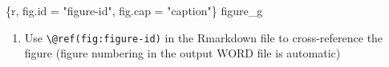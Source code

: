 \documentclass[
  letterpaper,
  DIV=11,
  numbers=noendperiod]{scrreprt}
\newenvironment{Shaded}{\begin{snugshade}}{\end{snugshade}}
\newcommand{\InformationTok}[1]{\textcolor[rgb]{0.37,0.37,0.37}{#1}}
\newcommand{\NormalTok}[1]{\textcolor[rgb]{0.00,0.23,0.31}{#1}}
\providecommand{\tightlist}{%
  \setlength{\itemsep}{0pt}\setlength{\parskip}{0pt}}\usepackage{longtable,booktabs,array}
\begin{document}
\begin{Shaded}
\begin{Highlighting}[]
\InformationTok{\textasciigrave{}\textasciigrave{}\textasciigrave{}\{r, fig.id = "figure{-}id", fig.cap = "caption"\}}
\NormalTok{figure\_g }
\InformationTok{\textasciigrave{}\textasciigrave{}\textasciigrave{}}
\end{Highlighting}
\end{Shaded}

\begin{enumerate}
\def\labelenumi{\arabic{enumi}.}
\setcounter{enumi}{2}
\tightlist
\item
  Use \texttt{\textbackslash{}@ref(fig:figure-id)} in the Rmarkdown file
  to cross-reference the figure (figure numbering in the output WORD
  file is automatic)
\end{enumerate}
\end{document}
